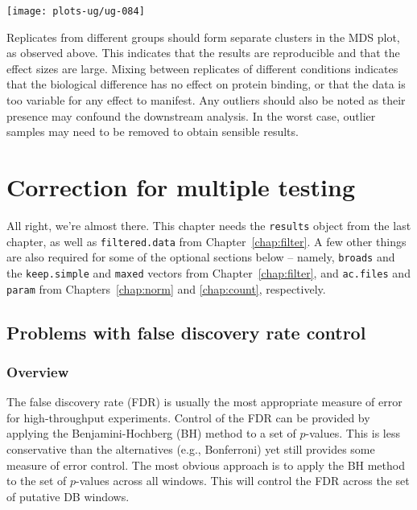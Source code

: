 \documentclass[12pt]{report}
\newcommand{\code}[1]{{\small\texttt{#1}}}
\newenvironment{combox}
{ \begin{shaded}\begin{center}\begin{minipage}[t]{0.95\textwidth} }
{ \end{minipage}\end{center}\end{shaded} }
\begin{document}
\begin{center}
\texttt{[image: plots-ug/ug-084]}
\end{center}

Replicates from different groups should form separate clusters in the MDS plot, as observed above.
This indicates that the results are reproducible and that the effect sizes are large.
Mixing between replicates of different conditions indicates that the biological difference has no effect on protein binding, or that the data is too variable for any effect to manifest.
Any outliers should also be noted as their presence may confound the downstream analysis.
In the worst case, outlier samples may need to be removed to obtain sensible results.



\chapter{Correction for multiple testing}

\begin{combox}
All right, we're almost there. 
This chapter needs the \code{results} object from the last chapter, as well as \code{filtered.data} from Chapter~\ref{chap:filter}.
A few other things are also required for some of the optional sections below -- namely, \code{broads} and the \code{keep.simple} and \code{maxed} vectors from Chapter~\ref{chap:filter}, and \code{ac.files} and \code{param} from Chapters~\ref{chap:norm} and \ref{chap:count}, respectively.
\end{combox}

\section{Problems with false discovery rate control}

\subsection{Overview}
The false discovery rate (FDR) is usually the most appropriate measure of error for high-throughput experiments. 
Control of the FDR can be provided by applying the Benjamini-Hochberg (BH) method \citep{benjamini1995} to a set of $p$-values. 
This is less conservative than the alternatives (e.g., Bonferroni) yet still provides some measure of error control. 
The most obvious approach is to apply the BH method to the set of $p$-values across all windows. 
This will control the FDR across the set of putative DB windows.
\end{document}
